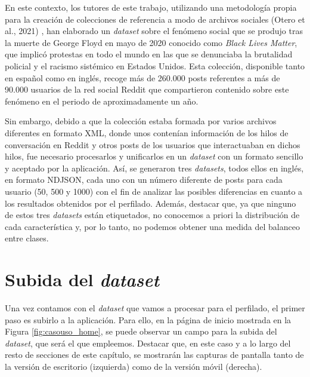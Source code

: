 \bigskip
En este contexto, los tutores de este trabajo, utilizando una metodología propia para la creación de colecciones de referencia
a modo de archivos sociales
(Otero et al., 2021) \cite{oterorodilla2021}, han elaborado un \textit{dataset} sobre el fenómeno social
que se produjo tras la muerte de George Floyd en mayo de 2020 conocido como \textit{Black Lives Matter},
que implicó protestas en todo el mundo en las que se denunciaba la brutalidad policial y el racismo sistémico en Estados Unidos. Esta colección,
disponible tanto en español como en inglés, recoge más de 260.000 posts referentes a más de 90.000 usuarios de la red social Reddit que compartieron contenido sobre este
fenómeno en el periodo de aproximadamente un año.

\bigskip
Sin embargo, debido a que la colección estaba formada por varios archivos diferentes en formato XML, donde unos contenían información de los hilos
de conversación en Reddit y otros posts de los usuarios que interactuaban en dichos hilos, fue necesario procesarlos y unificarlos
en un \textit{dataset} con un formato sencillo y aceptado por la aplicación. Así, se generaron tres \textit{datasets}, todos ellos
en inglés, en formato NDJSON, cada uno con
un número diferente de posts para cada usuario (50, 500 y 1000) con el fin de analizar las posibles diferencias en cuanto a los resultados
obtenidos por el perfilado. Además, destacar que, ya que ninguno de estos tres \textit{datasets} están etiquetados, no conocemos a priori
la distribución de cada característica y, por lo tanto, no podemos obtener una medida del balanceo entre clases.

\section{Subida del \textit{dataset}}
\label{sec:casouso_subida_dataset}

Una vez contamos con el \textit{dataset} que vamos a procesar para el perfilado, el primer paso es subirlo a la aplicación. Para ello,
en la página de inicio mostrada en la Figura \ref{fig:casouso_home}, se puede observar un campo para la subida del \textit{dataset}, que será el que empleemos.
Destacar que, en este caso y a lo largo del resto de secciones de este capítulo,
se mostrarán las capturas de pantalla tanto de la versión de escritorio (izquierda) como de la versión móvil (derecha).

